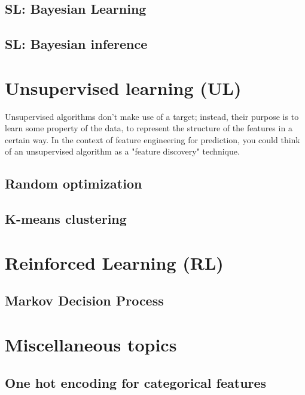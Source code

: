 \documentclass[12pt]{report}
\begin{document}
\section{SL: Bayesian Learning}
\section{SL: Bayesian inference}


\chapter[Unsupervised learning]{Unsupervised learning (UL)}

Unsupervised algorithms don't make use of a target; instead, their purpose is to learn some property of the data, to represent the structure of the features in a certain way. In the context of feature engineering for prediction, you could think of an unsupervised algorithm as a "feature discovery" technique.

\section{Random optimization}

\section{K-means clustering}



\chapter[Reinforced Learning]{Reinforced Learning (RL)}

\section{Markov Decision Process}

\chapter[Miscellaneous topics]{Miscellaneous topics}

\section{One hot encoding for categorical features}
\label{sec:one-hot}
\end{document}
